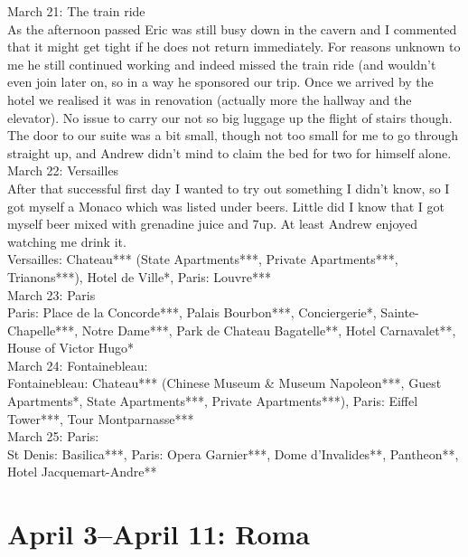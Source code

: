 March 21: The train ride\\
As the afternoon passed Eric was still busy down in the cavern and I commented that it might get tight if he does not return immediately. For reasons unknown to me he still continued working and indeed missed the train ride (and wouldn't even join later on, so in a way he sponsored our trip. Once we arrived by the hotel we realised it was in renovation (actually more the hallway and the elevator). No issue to carry our not so big luggage up the flight of stairs though. The door to our suite was a bit small, though not too small for me to go through straight up, and Andrew didn't mind to claim the bed for two for himself alone.\\

March 22: Versailles\\
After that successful first day I wanted to try out something I didn't know, so I got myself a Monaco which was listed under beers. Little did I know that I got myself beer mixed with grenadine juice and 7up. At least Andrew enjoyed watching me drink it.\\

Versailles: Chateau*** (State Apartments***, Private Apartments***, Trianons***), Hotel de Ville*, Paris: Louvre***\\

March 23: Paris\\
Paris: Place de la Concorde***, Palais Bourbon***, Conciergerie*, Sainte-Chapelle***, Notre Dame***, Park de Chateau Bagatelle**, Hotel Carnavalet**, House of Victor Hugo*\\

March 24: Fontainebleau:\\
Fontainebleau: Chateau*** (Chinese Museum \& Museum Napoleon***, Guest Apartments*, State Apartments***, Private Apartments***), Paris: Eiffel Tower***, Tour Montparnasse***\\

March 25: Paris:\\
St Denis: Basilica***, Paris: Opera Garnier***, Dome d'Invalides**, Pantheon**, Hotel Jacquemart-Andre**

\section{April 3--April 11: Roma}
\label{Roma2013}

